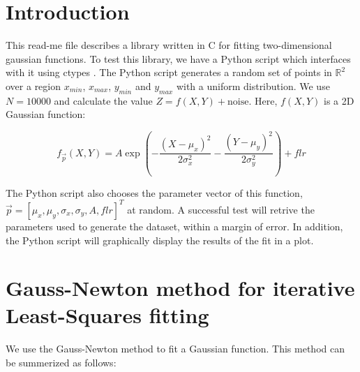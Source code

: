 \documentclass{article}
\begin{document}

\section{Introduction}

This read-me file describes a library written in C for fitting two-dimensional gaussian functions. To test this library, we have a Python script which interfaces with it using ctypes \cite{ctypes}. The Python script generates a random set of points in $\mathbb{R}^2$ over a region $x_{min}$, $x_{max}$, $y_{min}$ and $y_{max}$ with a uniform distribution. We use $N=10000$ and calculate the value $Z=f(X,Y)+\text{noise}$. Here, $f(X,Y)$ is a 2D Gaussian function:

\begin{equation}
f_{\overrightarrow{p}}(X,Y) = A\exp(-\frac{(X-\mu_x)^2}{2\sigma_x^2}-\frac{(Y-\mu_y)^2}{2\sigma_y^2}) + flr
\label{twoDGauss}
\end{equation}

The Python script also chooses the parameter vector of this function, \\$\overrightarrow{p}=[\mu_x, \mu_y, \sigma_x, \sigma_y, A, flr]^T$ at random. A successful test will retrive the parameters used to generate the dataset, within a margin of error. In addition, the Python script will graphically display the results of the fit in a plot. 

\section{Gauss-Newton method for iterative Least-Squares fitting} \label{sec_fit}

We use the Gauss-Newton method to fit a Gaussian function. This method can be summerized as follows:  
\end{document}
